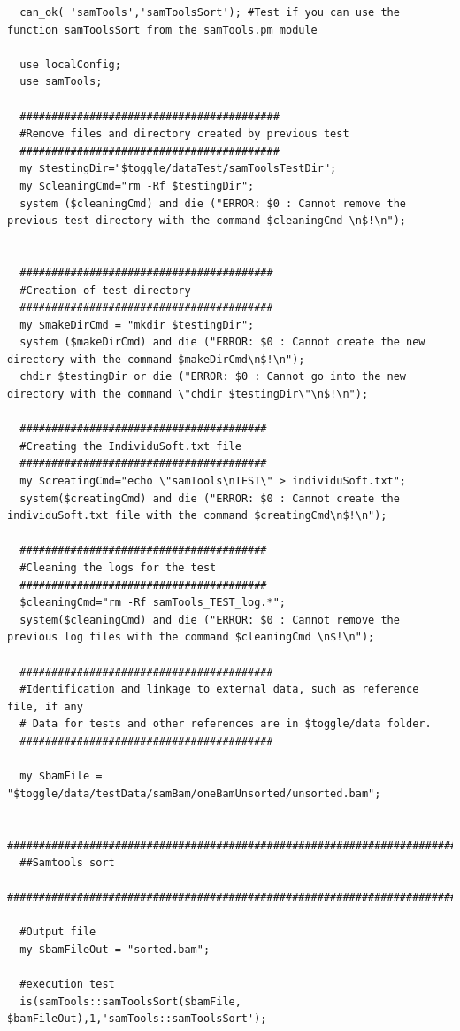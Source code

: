 \documentclass[a4paper,10pt]{report}
\begin{document}
\begin{lstlisting}
  can_ok( 'samTools','samToolsSort'); #Test if you can use the function samToolsSort from the samTools.pm module

  use localConfig;
  use samTools;
  
  #########################################
  #Remove files and directory created by previous test
  #########################################
  my $testingDir="$toggle/dataTest/samToolsTestDir";
  my $cleaningCmd="rm -Rf $testingDir"; 
  system ($cleaningCmd) and die ("ERROR: $0 : Cannot remove the previous test directory with the command $cleaningCmd \n$!\n");


  ########################################
  #Creation of test directory
  ########################################
  my $makeDirCmd = "mkdir $testingDir";
  system ($makeDirCmd) and die ("ERROR: $0 : Cannot create the new directory with the command $makeDirCmd\n$!\n");
  chdir $testingDir or die ("ERROR: $0 : Cannot go into the new directory with the command \"chdir $testingDir\"\n$!\n");

  #######################################
  #Creating the IndividuSoft.txt file
  #######################################
  my $creatingCmd="echo \"samTools\nTEST\" > individuSoft.txt";
  system($creatingCmd) and die ("ERROR: $0 : Cannot create the individuSoft.txt file with the command $creatingCmd\n$!\n");

  #######################################
  #Cleaning the logs for the test
  #######################################
  $cleaningCmd="rm -Rf samTools_TEST_log.*";
  system($cleaningCmd) and die ("ERROR: $0 : Cannot remove the previous log files with the command $cleaningCmd \n$!\n");

  ########################################
  #Identification and linkage to external data, such as reference file, if any
  # Data for tests and other references are in $toggle/data folder.
  ########################################
  
  my $bamFile = "$toggle/data/testData/samBam/oneBamUnsorted/unsorted.bam";
  
  ################################################################################################
  ##Samtools sort
  ################################################################################################

  #Output file
  my $bamFileOut = "sorted.bam";

  #execution test
  is(samTools::samToolsSort($bamFile, $bamFileOut),1,'samTools::samToolsSort');


\end{lstlisting}
\end{document}
